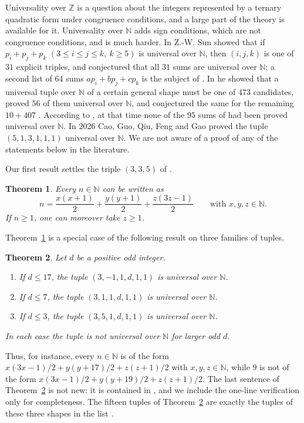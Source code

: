 \documentclass[11pt]{amsart}
\newtheorem{theorem}{Theorem}[section]
\theoremstyle{definition}
\theoremstyle{remark}
\newcommand{\N}{\mathbb{N}}
\newcommand{\Z}{\mathbb{Z}}
\begin{document}
Universality over $\Z$ is a question about the integers represented by a ternary quadratic form
under congruence conditions, and a large part of the theory is available for it.
Universality over $\N$ adds sign conditions, which are not congruence conditions, and is much harder.
In \cite{S15} Z.-W. Sun showed that if $p_i+p_j+p_k$ $(3\le i\le j\le k,\ k\ge 5)$ is universal over $\N$,
then $(i,j,k)$ is one of $31$ explicit triples, and conjectured \cite[Conjecture~1.10]{S15}
that all $31$ sums are universal over $\N$; a second list of $64$ sums $ap_i+bp_j+cp_k$ is the subject of
\cite[Conjecture~1.13]{S15}. In \cite{S20} he showed that a universal tuple over $\N$ of a certain general shape must be one of $473$ candidates, proved $56$
of them universal over $\N$, and conjectured the same for the remaining $10+407$
\cite[Conjectures~1.2 and~1.5]{S20}. According to \cite{S20}, at that time none of the $95$ sums of \cite{S15}
had been proved universal over $\N$.
In 2026 Cao, Guo, Qiu, Feng and Gao \cite{CGQFG} proved the tuple $(5,1,3,1,1,1)$ universal over $\N$.
We are not aware of a proof of any of the statements below in the literature.

Our first result settles the triple $(3,3,5)$ of \cite[Conjecture~1.10]{S15}.

\begin{theorem}\label{thm:main}
Every $n\in\N$ can be written as
\[
n=\frac{x(x+1)}{2}+\frac{y(y+1)}{2}+\frac{z(3z-1)}{2}\qquad\text{with } x,y,z\in\N .
\]
If $n\ge 1$, one can moreover take $z\ge 1$.
\end{theorem}

Theorem~\ref{thm:main} is a special case of the following result on three families of tuples.

\begin{theorem}\label{thm:family}
Let $d$ be a positive odd integer.
\begin{enumerate}
\item[(i)] If $d\le 17$, the tuple $(3,-1,1,d,1,1)$ is universal over $\N$.
\item[(ii)] If $d\le 7$, the tuple $(3,1,1,d,1,1)$ is universal over $\N$.
\item[(iii)] If $d\le 3$, the tuple $(3,5,1,d,1,1)$ is universal over $\N$.
\end{enumerate}
In each case the tuple is not universal over $\N$ for larger odd $d$.
\end{theorem}

Thus, for instance, every $n\in\N$ is of the form $x(3x-1)/2+y(y+17)/2+z(z+1)/2$ with $x,y,z\in\N$,
while $9$ is not of the form $x(3x-1)/2+y(y+19)/2+z(z+1)/2$.
The last sentence of Theorem~\ref{thm:family} is not new: it is contained in \cite[Theorem~1.4(ii)]{S20},
and we include the one-line verification only for completeness.
The fifteen tuples of Theorem~\ref{thm:family} are exactly the tuples of these three shapes in the list
\cite[Appendix]{S20}.
\end{document}
